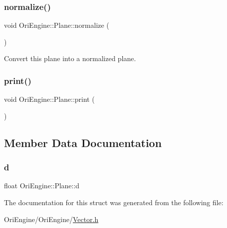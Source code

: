 \subsubsection{\texorpdfstring{normalize()}{normalize()}}
{\footnotesize\ttfamily void Ori\+Engine\+::\+Plane\+::normalize (\begin{DoxyParamCaption}{ }\end{DoxyParamCaption})\hspace{0.3cm}{\ttfamily [inline]}}



Convert this plane into a normalized plane. 

\hypertarget{struct_ori_engine_1_1_plane_a607d6de04c3f0c5ea9b06cc1397f3227}{}\label{struct_ori_engine_1_1_plane_a607d6de04c3f0c5ea9b06cc1397f3227} 
\subsubsection{\texorpdfstring{print()}{print()}}
{\footnotesize\ttfamily void Ori\+Engine\+::\+Plane\+::print (\begin{DoxyParamCaption}{ }\end{DoxyParamCaption})\hspace{0.3cm}{\ttfamily [inline]}}



\subsection{Member Data Documentation}
\hypertarget{struct_ori_engine_1_1_plane_aa810584e42c4223d18fec10d4099a9eb}{}\label{struct_ori_engine_1_1_plane_aa810584e42c4223d18fec10d4099a9eb} 
\subsubsection{\texorpdfstring{d}{d}}
{\footnotesize\ttfamily float Ori\+Engine\+::\+Plane\+::d}



The documentation for this struct was generated from the following file\+:\begin{DoxyCompactItemize}
\item 
Ori\+Engine/\+Ori\+Engine/\hyperlink{_vector_8h}{Vector.\+h}\end{DoxyCompactItemize}
